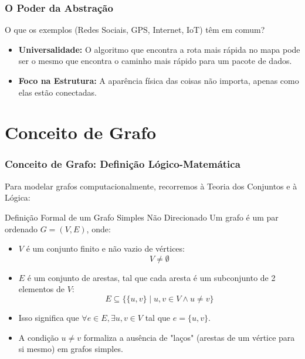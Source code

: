 \documentclass[9pt]{beamer}
\begin{document}
\begin{frame}
    \frametitle{O Poder da Abstração}
    O que os exemplos (Redes Sociais, GPS, Internet, IoT) têm em comum?
    \vspace{0.5cm}
    \begin{itemize}
        \item \textbf{Universalidade:} O algoritmo que encontra a rota mais rápida no mapa pode ser o mesmo que encontra o caminho mais rápido para um pacote de dados.
        \item \textbf{Foco na Estrutura:} A aparência física das coisas não importa, apenas como elas estão conectadas.
    \end{itemize}
    \vspace{0.5cm}
    \begin{center}
    \end{center}
\end{frame}



\section{Conceito de Grafo}

\begin{frame}
    \frametitle{Conceito de Grafo: Definição Lógico-Matemática}
    Para modelar grafos computacionalmente, recorremos à Teoria dos Conjuntos e à Lógica:
    \vspace{0.5cm}
    \begin{block}{Definição Formal de um Grafo Simples Não Direcionado}
        Um grafo é um par ordenado $G = (V, E)$, onde:
        \begin{itemize}
            \item $V$ é um conjunto finito e não vazio de vértices:
            \[ V \neq \emptyset \]
            \item $E$ é um conjunto de arestas, tal que cada aresta é um subconjunto de 2 elementos de $V$:
            \[ E \subseteq \big\{ \{u, v\} \mid u, v \in V \land u \neq v \big\} \]
        \end{itemize}
    \end{block}
    \vspace{0.3cm}
    \begin{itemize}
        \item Isso significa que $\forall e \in E, \exists u, v \in V$ tal que $e = \{u, v\}$.
        \item A condição $u \neq v$ formaliza a ausência de "laços" (arestas de um vértice para si mesmo) em grafos simples.
    \end{itemize}
\end{frame}
\end{document}
